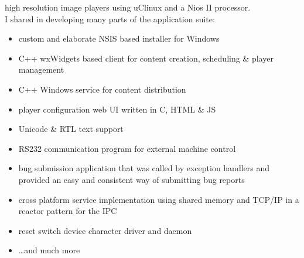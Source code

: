 \begin{entrylist}
{            high resolution image players using uClinux and a Nios II processor.\\
            I shared in developing many parts of the application suite:
            \begin{itemize}
                \item custom and elaborate NSIS based installer for Windows
                \item C++ wxWidgets based client for content creation, scheduling \& player management
                \item C++ Windows service for content distribution
                \item player configuration web UI written in C, HTML \& JS
                \item Unicode \& RTL text support
                \item RS232 communication program for external machine control
                \item bug submission application that was called by exception handlers and provided an easy and consistent way of submitting bug reports
                \item cross platform service implementation using shared memory and TCP/IP in a reactor pattern for the IPC
                \item reset switch device character driver and daemon
                \item …and much more

\end{itemize}}
\end{entrylist}
